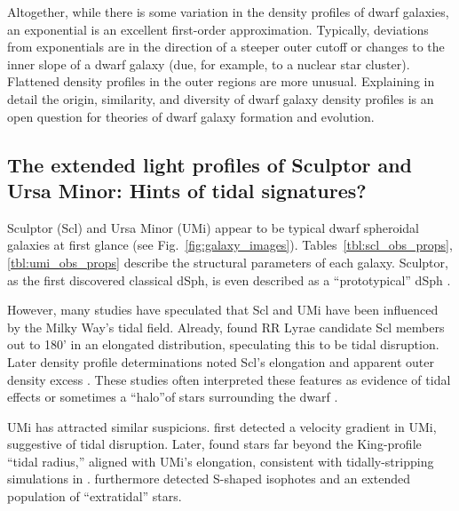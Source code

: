 Altogether, while there is some variation in the density profiles of
dwarf galaxies, an exponential is an excellent first-order
approximation. Typically, deviations from exponentials are in the
direction of a steeper outer cutoff or changes to the inner slope of a
dwarf galaxy (due, for example, to a nuclear star cluster). Flattened
density profiles in the outer regions are more unusual. Explaining in
detail the origin, similarity, and diversity of dwarf galaxy density
profiles is an open question for theories of dwarf galaxy formation and
evolution.

\subsection{The extended light profiles of Sculptor and Ursa Minor:
Hints of tidal signatures?}\label{sec:scl_umi_obs_tides}

Sculptor (Scl) and Ursa Minor (UMi) appear to be typical dwarf
spheroidal galaxies at first glance (see Fig.~\ref{fig:galaxy_images}).
Tables~\ref{tbl:scl_obs_props}, \ref{tbl:umi_obs_props} describe the
structural parameters of each galaxy. Sculptor, as the first discovered
classical dSph, is even described as a ``prototypical'' dSph
\citep[e.g.,][]{mcconnachie2012}.

However, many studies have speculated that Scl and UMi have been
influenced by the Milky Way's tidal field. Already,
\citet{innanen+papp1979} found RR Lyrae candidate Scl members
\citep[from][]{vanagt1978} out to 180' in an elongated distribution,
speculating this to be tidal disruption. Later density profile
determinations noted Scl's elongation and apparent outer density excess
\citetext{\citealp{eskridge1988}; \citealp{IH1995}; \citealp{walcher+2003}; \citealp{westfall+2006}; \citealp[but
see also][]{coleman+dacosta+bland-hawthorn2005}}. These studies often
interpreted these features as evidence of tidal effects
\citep[e.g.,][]{walcher+2003} or sometimes a ``halo''of stars
surrounding the dwarf \citep{westfall+2006}.

UMi has attracted similar suspicions. \citet{hargreaves+1994} first
detected a velocity gradient in UMi, suggestive of tidal disruption.
Later, \citet{martinez-delgado+2001} found stars far beyond the
King-profile ``tidal radius,'' aligned with UMi's elongation, consistent
with tidally-stripping simulations in
\citet{gomez-flechoso+martinez-delgado2003}. \citet{palma+2003}
furthermore detected S-shaped isophotes and an extended population of
``extratidal'' stars.

